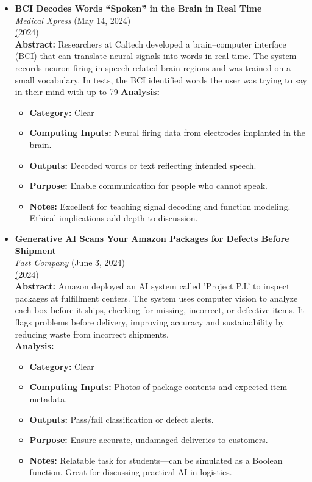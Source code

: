 \documentclass[11pt]{article}
\begin{document}
\begin{itemize}
\item \textbf{BCI Decodes Words “Spoken” in the Brain in Real Time} \\
\textit{Medical Xpress} (May 14, 2024)\\
\href{https://technews.acm.org/archives.cfm?fo=2024-05-may#16} (2024)\\
\textbf{Abstract:} Researchers at Caltech developed a brain–computer interface (BCI) that can translate neural signals into words in real time. The system records neuron firing in speech-related brain regions and was trained on a small vocabulary. In tests, the BCI identified words the user was trying to say in their mind with up to 79%
\textbf{Analysis:}\\
\begin{itemize}
\item \textbf{Category:} Clear
\item \textbf{Computing Inputs:} Neural firing data from electrodes implanted in the brain.
\item \textbf{Outputs:} Decoded words or text reflecting intended speech.
\item \textbf{Purpose:} Enable communication for people who cannot speak.
\item \textbf{Notes:} Excellent for teaching signal decoding and function modeling. Ethical implications add depth to discussion.
\end{itemize}

\item \textbf{Generative AI Scans Your Amazon Packages for Defects Before Shipment} \\
\textit{Fast Company} (June 3, 2024)\\
\href{https://technews.acm.org/archives.cfm?fo=2024-06-jun#21} (2024)\\
\textbf{Abstract:} Amazon deployed an AI system called 'Project P.I.' to inspect packages at fulfillment centers. The system uses computer vision to analyze each box before it ships, checking for missing, incorrect, or defective items. It flags problems before delivery, improving accuracy and sustainability by reducing waste from incorrect shipments.\\
\textbf{Analysis:}\\
\begin{itemize}
\item \textbf{Category:} Clear
\item \textbf{Computing Inputs:} Photos of package contents and expected item metadata.
\item \textbf{Outputs:} Pass/fail classification or defect alerts.
\item \textbf{Purpose:} Ensure accurate, undamaged deliveries to customers.
\item \textbf{Notes:} Relatable task for students—can be simulated as a Boolean function. Great for discussing practical AI in logistics.
\end{itemize}


\end{itemize}
\end{document}
